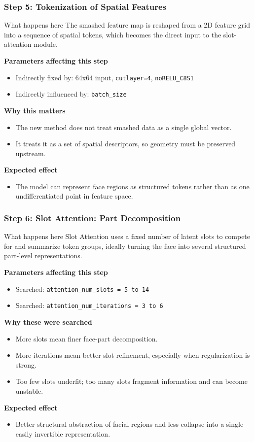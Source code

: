 \documentclass[aspectratio=169]{beamer}
\newcommand{\stepheader}[2]{
    \frametitle{Step #1: #2}
}
\begin{document}
\begin{frame}
    \stepheader{5}{Tokenization of Spatial Features}
    \small
    \begin{block}{What happens here}
        The smashed feature map is reshaped from a 2D feature grid into a sequence of spatial tokens, which becomes the direct input to the slot-attention module.
    \end{block}
    \textbf{Parameters affecting this step}
    \begin{itemize}
        \item Indirectly fixed by: 64x64 input, \texttt{cutlayer=4}, \texttt{noRELU\_C8S1}
        \item Indirectly influenced by: \texttt{batch\_size}
    \end{itemize}
    \textbf{Why this matters}
    \begin{itemize}
        \item The new method does not treat smashed data as a single global vector.
        \item It treats it as a set of spatial descriptors, so geometry must be preserved upstream.
    \end{itemize}
    \textbf{Expected effect}
    \begin{itemize}
        \item The model can represent face regions as structured tokens rather than as one undifferentiated point in feature space.
    \end{itemize}
\end{frame}

\begin{frame}
    \stepheader{6}{Slot Attention: Part Decomposition}
    \small
    \begin{block}{What happens here}
        Slot Attention uses a fixed number of latent slots to compete for and summarize token groups, ideally turning the face into several structured part-level representations.
    \end{block}
    \textbf{Parameters affecting this step}
    \begin{itemize}
        \item Searched: \texttt{attention\_num\_slots = 5 to 14}
        \item Searched: \texttt{attention\_num\_iterations = 3 to 6}
    \end{itemize}
    \textbf{Why these were searched}
    \begin{itemize}
        \item More slots mean finer face-part decomposition.
        \item More iterations mean better slot refinement, especially when regularization is strong.
        \item Too few slots underfit; too many slots fragment information and can become unstable.
    \end{itemize}
    \textbf{Expected effect}
    \begin{itemize}
        \item Better structural abstraction of facial regions and less collapse into a single easily invertible representation.
    \end{itemize}
\end{frame}
\end{document}
